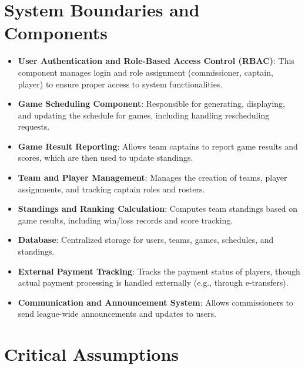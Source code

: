 \documentclass{article}
\begin{document}
\section{System Boundaries and Components}

\begin{itemize}
    \item \textbf{User Authentication and Role-Based Access Control (RBAC)}: This component manages login and role assignment (commissioner, captain, player) to ensure proper access to system functionalities.
    \item \textbf{Game Scheduling Component}: Responsible for generating, displaying, and updating the schedule for games, including handling rescheduling requests.
    \item \textbf{Game Result Reporting}: Allows team captains to report game results and scores, which are then used to update standings.
    \item \textbf{Team and Player Management}: Manages the creation of teams, player assignments, and tracking captain roles and rosters.
    \item \textbf{Standings and Ranking Calculation}: Computes team standings based on game results, including win/loss records and score tracking.
    \item \textbf{Database}: Centralized storage for users, teams, games, schedules, and standings.
    \item \textbf{External Payment Tracking}: Tracks the payment status of players, though actual payment processing is handled externally (e.g., through e-transfers).
    \item \textbf{Communication and Announcement System}: Allows commissioners to send league-wide announcements and updates to users.
\end{itemize}

\section{Critical Assumptions}
\end{document}
